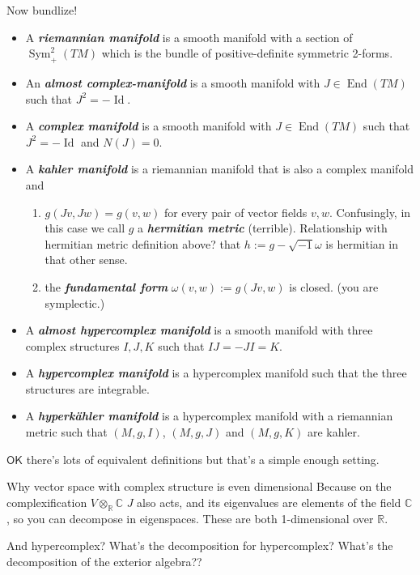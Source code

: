 Now bundlize!
\begin{itemize}
\item A \textit{\textbf{riemannian manifold}} is a smooth manifold with a section of \(\operatorname{Sym}^2_+(TM)\) which is the bundle of positive-definite symmetric 2-forms.
\item An \textit{\textbf{almost complex-manifold}} is a smooth manifold with \(J \in \operatorname{End}(TM)\) such that \(J^2=-\operatorname{Id}\).
\item A \textit{\textbf{complex manifold}} is a smooth manifold with \(J \in \operatorname{End}(TM)\) such that \(J^2=-\operatorname{Id}\) and \(N(J)=0\).
\item A \textit{\textbf{kahler manifold}} is a riemannian manifold that is also a complex manifold and
	\begin{enumerate}
	\item \(g(Jv,Jw)=g(v,w)\) for every pair of vector fields \(v,w\). Confusingly, in this case we call \(g\) a \textit{\textbf{hermitian metric}} (terrible). Relationship with hermitian metric definition above? that \(h:=g-\sqrt{-1}\omega\) is hermitian in that other sense.
	\item the \textit{\textbf{fundamental form}} \(\omega(v,w):=g(Jv,w)\) is closed. (you are symplectic.)
	\end{enumerate}
\item A \textit{\textbf{almost hypercomplex manifold}} is a smooth manifold with three complex structures \(I,J,K\) such that \(I J =- J I = K\).
\item A \textit{\textbf{hypercomplex manifold}} is a hypercomplex manifold such that the three structures are integrable.
\item A \textit{\textbf{hyperkähler manifold}} is a hypercomplex manifold with a riemannian metric such that \((M,g,I)\), \((M,g,J)\) and \((M,g,K)\) are kahler.
\end{itemize}
\(\mathsf{OK}\) there's lots of equivalent definitions but that's a simple enough setting.

\begin{thing8}{Why vector space with complex structure is even dimensional}\leavevmode
Because on the complexification \(V \otimes_{\mathbb{R}}\mathbb{C}\) \(J\) also acts, and its eigenvalues are elements of the field \(\mathbb{C}\), so you can decompose in eigenspaces. These are both 1-dimensional over \(\mathbb{R}\).
\end{thing8}

\begin{thing5}{And hypercomplex?}\leavevmode
What's the decomposition for hypercomplex? What's the decomposition of the exterior algebra??
\end{thing5}

